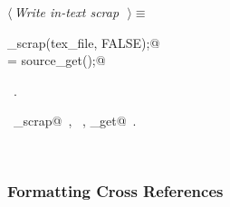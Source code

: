 \documentclass{report}
\begin{document}
\begin{flushleft} \small
\begin{minipage}{\linewidth} \label{scrap62}
$\langle\,${\it Write in-text scrap}\nobreak\ {\footnotesize {}}$\,\rangle\equiv$
\vspace{-1ex}
\begin{list}{}{} \item
\mbox{}\verb@copy_scrap(tex_file, FALSE);@\\
\mbox{}\verb@c = source_get();@\\
\mbox{}\verb@@{\NWsep}
\end{list}
\vspace{-1ex}
\footnotesize\addtolength{\baselineskip}{-1ex}
\begin{list}{}{\setlength{\itemsep}{-\parsep}\setlength{\itemindent}{-\leftmargin}}
\item \NWtxtMacroRefIn\ .
\end{list}
\vspace{-2ex}
\footnotesize\addtolength{\baselineskip}{-1ex}
\begin{list}{}{\setlength{\itemsep}{-\parsep}\setlength{\itemindent}{-\leftmargin}}
\item \NWtxtIdentsUsed\nobreak\  \verb@copy_scrap@\nobreak\ , \verb@FALSE@\nobreak\ , \verb@source_get@\nobreak\ .\end{list}
\end{minipage}\\[4ex]
\end{flushleft}
\subsubsection{Formatting Cross References}
\end{document}

